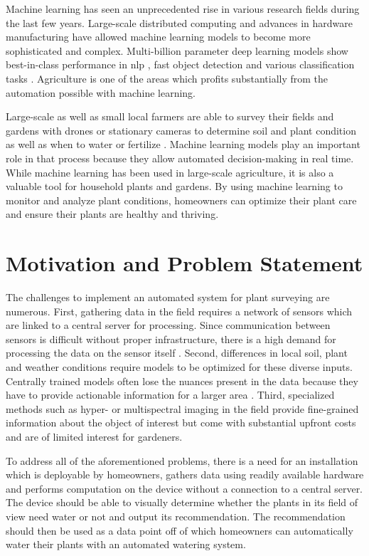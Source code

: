 \documentclass[final]{vutinfth} %
\begin{document}
Machine learning has seen an unprecedented rise in various research
fields during the last few years. Large-scale distributed computing
and advances in hardware manufacturing have allowed machine learning
models to become more sophisticated and complex. Multi-billion
parameter deep learning models show best-in-class performance in
\gls{nlp} \cite{brown2020}, fast object detection
\cite{bochkovskiy2020} and various classification tasks
\cite{zhong2022,ariss2022}. Agriculture is one of the areas which
profits substantially from the automation possible with machine
learning.

Large-scale as well as small local farmers are able to survey their
fields and gardens with drones or stationary cameras to determine soil
and plant condition as well as when to water or
fertilize \cite{ramos-giraldo2020}. Machine learning models play an
important role in that process because they allow automated
decision-making in real time. While machine learning has been used in
large-scale agriculture, it is also a valuable tool for household
plants and gardens. By using machine learning to monitor and analyze
plant conditions, homeowners can optimize their plant care and ensure
their plants are healthy and thriving.

\section{Motivation and Problem Statement}
\label{sec:motivation}

The challenges to implement an automated system for plant surveying
are numerous. First, gathering data in the field requires a network of
sensors which are linked to a central server for processing. Since
communication between sensors is difficult without proper
infrastructure, there is a high demand for processing the data on the
sensor itself \cite{mcenroe2022}. Second, differences in local soil,
plant and weather conditions require models to be optimized for these
diverse inputs. Centrally trained models often lose the nuances
present in the data because they have to provide actionable
information for a larger area \cite{awad2019}. Third, specialized
methods such as hyper- or multispectral imaging in the field provide
fine-grained information about the object of interest but come with
substantial upfront costs and are of limited interest for gardeners.

To address all of the aforementioned problems, there is a need for an
installation which is deployable by homeowners, gathers data using
readily available hardware and performs computation on the device
without a connection to a central server. The device should be able to
visually determine whether the plants in its field of view need water
or not and output its recommendation. The recommendation should then
be used as a data point off of which homeowners can automatically
water their plants with an automated watering system.
\end{document}
